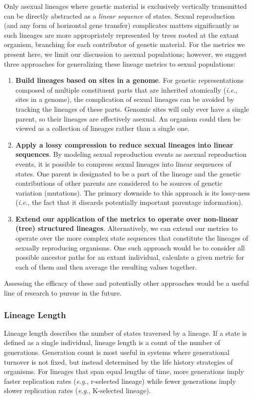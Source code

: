 \documentclass[letterpaper]{article}
\begin{document}
Only asexual lineages %
where genetic material is exclusively vertically transmitted can be directly abstracted as a \textit{linear sequence} of states.
Sexual reproduction (and any form of horizontal gene transfer) complicates matters significantly as such lineages are more appropriately represented by trees rooted at the extant organism, branching for each contributor of genetic material. For the metrics we present here, we limit our discussion to asexual populations; however, we suggest three approaches for generalizing these lineage metrics to sexual populations: 
\begin{enumerate}
\item \textbf{Build lineages based on sites in a genome}. For genetic representations composed of multiple constituent parts that are inherited atomically (\textit{i.e.}, sites in a genome), the complication of sexual lineages can be avoided by tracking the lineages of these parts. Genomic sites will only ever have a single parent, so their lineages are effectively asexual. An organism could then be viewed as a collection of lineages rather than a single one.
\item \textbf{Apply a lossy compression to reduce sexual lineages into linear sequences}. By modeling sexual reproduction events as asexual reproduction events, it is possible to compress sexual lineages into linear sequences of states. One parent is designated to be a part of the lineage and the genetic contributions of other parents are considered to be sources of genetic variation (mutations). The primary downside to this approach is its lossy-ness (\textit{i.e.}, the fact that it discards potentially important parentage information).  
\item \textbf{Extend our application of the metrics to operate over non-linear (tree) structured lineages}. Alternatively, we can extend our metrics to operate over the more complex state sequences that constitute the lineages of sexually reproducing organisms. One such approach would be to consider all possible ancestor paths for an extant individual, calculate a given metric for each of them and then average the resulting values together.
\end{enumerate}

Assessing the efficacy of these and potentially other approaches would be a useful line of research to pursue in the future.

\subsubsection{Lineage Length}
Lineage length describes the number of states traversed by a lineage. If a state is defined as a single individual, lineage length is a count of the number of generations. Generation count is most useful in systems where generational turnover is not fixed, but instead determined by the life history strategies of organisms. For lineages that span equal lengths of time, more generations imply faster replication rates (\textit{e.g.}, r-selected lineage) while fewer generations imply slower replication rates (\textit{e.g.}, K-selected lineage). 
\end{document}
